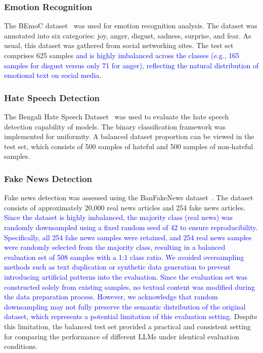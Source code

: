 \documentclass[10pt,letterpaper]{article}
\newcommand{\rev}[1]{\textcolor{blue}{#1}}
\begin{document}
\subsubsection*{Emotion Recognition}
The BEmoC dataset~\cite{b32} was used for emotion recognition analysis. The dataset was annotated into six categories: joy, anger, disgust, sadness, surprise, and fear. As usual, this dataset was gathered from social networking sites. The test set comprises 625 samples \rev{and is highly imbalanced across the classes (e.g., 165 samples for disgust versus only 71 for anger), reflecting the natural distribution of emotional text on social media.}

\subsubsection*{Hate Speech Detection}
The Bengali Hate Speech Dataset~\cite{b33} was used to evaluate the hate speech detection capability of models. The binary classification framework was implemented for uniformity. A balanced dataset proportion can be viewed in the test set, which consists of 500 samples of hateful and 500 samples of non-hateful samples.

\subsubsection*{Fake News Detection}
Fake news detection was assessed using the BanFakeNews dataset~\cite{b34}. The dataset consists of approximately 20,000 real news articles and 254 fake news articles. \rev{Since the dataset is highly imbalanced, the majority class (real news) was randomly downsampled using a fixed random seed of 42 to ensure reproducibility. Specifically, all 254 fake news samples were retained, and 254 real news samples were randomly selected from the majority class, resulting in a balanced evaluation set of 508 samples with a 1:1 class ratio. We avoided oversampling methods such as text duplication or synthetic data generation to prevent introducing artificial patterns into the evaluation. Since the evaluation set was constructed solely from existing samples, no textual content was modified during the data preparation process. However, we acknowledge that random downsampling may not fully preserve the semantic distribution of the original dataset, which represents a potential limitation of this evaluation setting.} Despite this limitation, the balanced test set provided a practical and consistent setting for comparing the performance of different LLMs under identical evaluation conditions.
\end{document}
